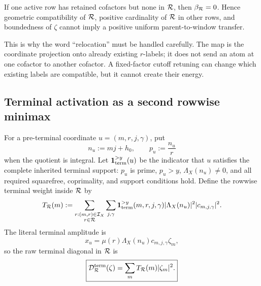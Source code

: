 \begin{corollary}
\label{cor:tpc59-zero-occupancy-obstruction}
If one active row has retained cofactors but none in \(\mathcal R\), then
\(\beta_{\mathcal R}=0\).  Hence geometric compatibility of \(\mathcal R\), positive
cardinality of \(\mathcal R\) in other rows, and boundedness of \(\zeta\) cannot
imply a positive uniform parent-to-window transfer.
\end{corollary}

This is why the word ``relocation'' must be handled carefully.  The map is
the coordinate projection onto already existing \(r\)-labels; it does not
send an atom at one cofactor to another cofactor.  A fixed-factor cutoff
retuning can change which existing labels are compatible, but it cannot
create their energy.

\subsection{Terminal activation as a second rowwise minimax}

For a pre-terminal coordinate \(u=(m,r,j,\gamma)\), put
\begin{equation}
 n_u:=mj+h_0,
 \qquad
 p_u:=\frac{n_u}{r}
 \label{eq:tpc59-terminal-candidate}
\end{equation}
when the quotient is integral.  Let \(\mathbf 1_{\rm term}^{>y}(u)\) be the
indicator that \(u\) satisfies the complete inherited terminal support:
\(p_u\) is prime, \(p_u>y\), \(\Lambda_X(n_u)\ne0\), and all required
squarefree, coprimality, and support conditions hold.  Define the rowwise
terminal weight inside \(\mathcal R\) by
\begin{equation}
 T_{\mathcal R}(m)
 :=\sum_{\substack{r:(m,r)\in\mathcal I_X\\r\in\mathcal R}}
   \sum_{j,\gamma}
   \mathbf 1_{\rm term}^{>y}(m,r,j,\gamma)
   |\Lambda_X(n_u)|^2|c_{m,j,\gamma}|^2.
 \label{eq:tpc59-row-terminal-weight}
\end{equation}
The literal terminal amplitude is
\begin{equation}
 x_u=\mu(r)\Lambda_X(n_u)c_{m,j,\gamma}\zeta_m,
 \label{eq:tpc59-terminal-amplitude}
\end{equation}
so the raw terminal diagonal in \(\mathcal R\) is
\begin{equation}
 \boxed{
 \mathcal D_{\mathcal R}^{\rm term}(\zeta)
 =\sum_mT_{\mathcal R}(m)|\zeta_m|^2.}
 \label{eq:tpc59-terminal-energy-row-sum}
\end{equation}

